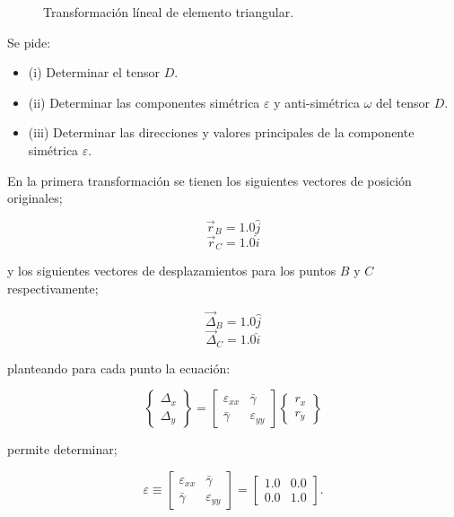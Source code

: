 \documentclass[../notas medios.tex]{subfiles}
\begin{document}
\begin{figure}[H]
     \centering
     \hspace{0.5cm}
     \caption{Transformación líneal de elemento triangular.}
     \label{steady_state1}
\end{figure}

Se pide:

\begin{itemize}
\item (i) Determinar el tensor $D$.
\item (ii) Determinar las componentes simétrica $\varepsilon$ y anti-simétrica $\omega$ del tensor $D$.
\item (iii) Determinar las direcciones y valores principales de la componente simétrica $\varepsilon$.
\end{itemize}

En la primera transformación se tienen los siguientes vectores de posición originales;

\[{\vec r_B} = 1.0\hat j\]
\[{\vec r_C} = 1.0\hat i\]

y los siguientes vectores de desplazamientos para los puntos $B$ y $C$ respectivamente;

\[{\vec \Delta _B} = 1.0\hat j\]
\[{\vec \Delta _C} = 1.0\hat i\]

planteando para cada punto la ecuación:

\[\left\{ {\begin{array}{*{20}{c}}
{{\Delta _x}}\\
{{\Delta _y}}
\end{array}} \right\} = \left[ {\begin{array}{*{20}{c}}
{{\varepsilon _{xx}}}&\bar{\gamma} \\
\bar{\gamma} &{{\varepsilon _{yy}}}
\end{array}} \right]\left\{ {\begin{array}{*{20}{c}}
{{r_x}}\\
{{r_y}}
\end{array}} \right\}\]

permite determinar;

\[\varepsilon \equiv \left[ {\begin{array}{*{20}{c}}
{{\varepsilon _{xx}}}&\bar{\gamma}\\
\bar{\gamma} &{{\varepsilon _{yy}}}
\end{array}} \right] = \left[ {\begin{array}{*{20}{c}}
{1.0}&{0.0}\\
{0.0}&{1.0}
\end{array}} \right].\]
\end{document}
